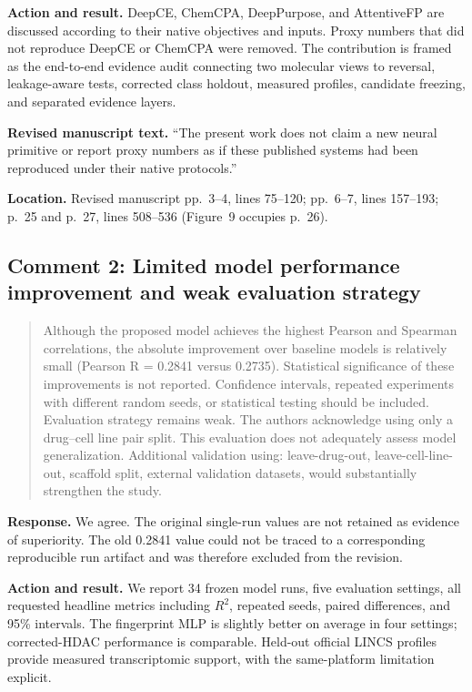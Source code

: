 \documentclass[10pt]{article}
\newenvironment{reviewcomment}{%
  \begin{quote}\small\itshape\color{black}
}{\end{quote}}
\newcommand{\Response}{\textbf{Response.} }
\newcommand{\Action}{\textbf{Action and result.} }
\newcommand{\RevisedText}{\textbf{Revised manuscript text.} }
\newcommand{\Location}{\textbf{Location.} }
\newcommand{\qtext}[1]{``#1''}
\begin{document}
\Action DeepCE, ChemCPA, DeepPurpose, and AttentiveFP are discussed according to their native objectives and inputs. Proxy numbers that did not reproduce DeepCE or ChemCPA were removed. The contribution is framed as the end-to-end evidence audit connecting two molecular views to reversal, leakage-aware tests, corrected class holdout, measured profiles, candidate freezing, and separated evidence layers.

\RevisedText \qtext{The present work does not claim a new neural primitive or report proxy numbers as if these published systems had been reproduced under their native protocols.}

\Location Revised manuscript pp.~3--4, lines 75--120; pp.~6--7, lines 157--193; p.~25 and p.~27, lines 508--536 (Figure~9 occupies p.~26).

\subsection*{Comment 2: Limited model performance improvement and weak evaluation strategy}
\begin{reviewcomment}
Although the proposed model achieves the highest Pearson and Spearman correlations, the absolute improvement over baseline models is relatively small (Pearson R = 0.2841 versus 0.2735). Statistical significance of these improvements is not reported. Confidence intervals, repeated experiments with different random seeds, or statistical testing should be included. Evaluation strategy remains weak. The authors acknowledge using only a drug–cell line pair split. This evaluation does not adequately assess model generalization. Additional validation using: leave-drug-out, leave-cell-line-out, scaffold split, external validation datasets, would substantially strengthen the study.
\end{reviewcomment}

\Response We agree. The original single-run values are not retained as evidence of superiority. The old 0.2841 value could not be traced to a corresponding reproducible run artifact and was therefore excluded from the revision.

\Action We report 34 frozen model runs, five evaluation settings, all requested headline metrics including $R^2$, repeated seeds, paired differences, and 95\% intervals. The fingerprint MLP is slightly better on average in four settings; corrected-HDAC performance is comparable. Held-out official LINCS profiles provide measured transcriptomic support, with the same-platform limitation explicit.
\end{document}
